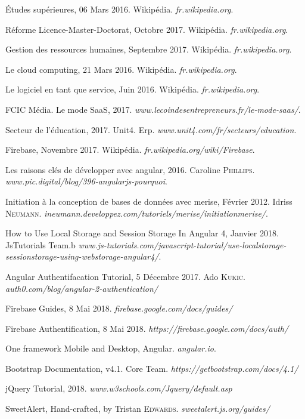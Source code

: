 \renewcommand{\bibname}{Webographie}
\begin{thebibliography}{99}
	Études supérieures, 06 Mars 2016. Wikipédia. \emph{fr.wikipedia.org}.
	\medskip
	
	Réforme Licence-Master-Doctorat, Octobre 2017. Wikipédia. \emph{fr.wikipedia.org}.
	\medskip
	
	Gestion des ressources humaines, Septembre 2017. Wikipédia. \emph{fr.wikipedia.org}.
	\medskip
	
	Le cloud computing, 21 Mars 2016. Wikipédia. \emph{fr.wikipedia.org}.
	\medskip
	
	Le logiciel en tant que service, Juin 2016. Wikipédia. \emph{fr.wikipedia.org}.
	\medskip
	
	FCIC Média. Le mode SaaS, 2017. \emph{www.lecoindesentrepreneurs.fr/le-mode-saas/}.
	\medskip
	
	Secteur de l'éducation, 2017. Unit4. Erp. \emph{www.unit4.com/fr/secteurs/education}.
	\medskip
	
	Firebase, Novembre 2017. Wikipédia. \emph{fr.wikipedia.org/wiki/Firebase}.
	\medskip
	
	Les raisons clés de développer avec angular, 2016. Caroline \textsc{Phillips}. \emph{www.pic.digital/blog/396-angularjs-pourquoi}.
	\medskip
	
	Initiation à la conception de bases de données avec merise, Février 2012. Idriss \textsc{Neumann}. \emph{ineumann.developpez.com/tutoriels/merise/initiationmerise/}.
	\medskip
	
	How to Use Local Storage and Session Storage In Angular 4, Janvier 2018. JsTutorials Team.b \emph{www.js-tutorials.com/javascript-tutorial/use-localstorage-sessionstorage-using-webstorage-angular4/}.
	\medskip
	
	Angular Authentifacation Tutorial, 5 Décembre 2017. Ado \textsc{Kukic}. \emph{auth0.com/blog/angular-2-authentication/}
	\medskip
	
	Firebase Guides, 8 Mai 2018. \emph{firebase.google.com/docs/guides/}
	\medskip
	
	Firebase Authentification, 8 Mai 2018. \emph{https://firebase.google.com/docs/auth/}
	\medskip
	
	One framework Mobile and Desktop, Angular. \emph{angular.io}.
	\medskip
	
	Bootstrap Documentation, v4.1. Core Team. \emph{https://getbootstrap.com/docs/4.1/}
	\medskip
	
	jQuery Tutorial, 2018. \emph{www.w3schools.com/Jquery/default.asp}
	\medskip
	
	SweetAlert, Hand-crafted, by Tristan \textsc{Edwards}. \emph{sweetalert.js.org/guides/}
	\medskip
\end{thebibliography}